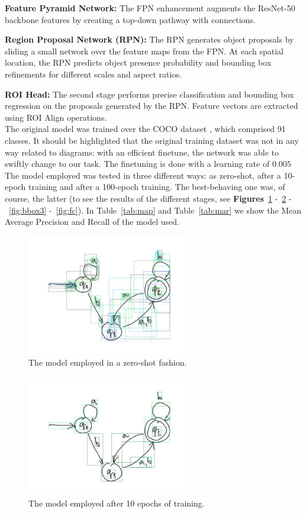 \documentclass[conference]{IEEEtran}
\begin{document}
\textbf{Feature Pyramid Network:} The FPN enhancement augments the ResNet-50 backbone features by creating a top-down pathway with connections.

\textbf{Region Proposal Network (RPN):} The RPN generates object proposals by sliding a small network over the feature maps from the FPN. At each spatial location, the RPN predicts object presence probability and bounding box refinements for different scales and aspect ratios.

\textbf{ROI Head:} The second stage performs precise classification and bounding box regression on the proposals generated by the RPN. Feature vectors are extracted using ROI Align operations. \\

The original model was trained over the COCO dataset \cite{coco}, which comprised 91 classes. It should be highlighted that the original training dataset was not in any way related to diagrams: with an efficient finetune, the network was able to swiftly change to our task. The finetuning is done with a learning rate of $0.005$ \\

The model employed was tested in three different ways: as zero-shot, after a 10-epoch training and after a 100-epoch training. The best-behaving one was, of course, the latter (to see the results of the different stages, see \textbf{Figures}~\ref{fig:bbox1} -~\ref{fig:bbox2} -~\ref{fig:bbox3} -~\ref{fig:fc}). In Table~\ref{tab:map} and Table~\ref{tab:mar} we show the Mean Average Precision and Recall of the model used.

\begin{figure}[H]
	\centering
	\includegraphics[width=200pt, height=150pt]{bbox1.jpg}
	\caption{The model employed in a zero-shot fashion.}
	\label{fig:bbox1}
\end{figure}

\begin{figure}[H]
	\centering
	\includegraphics[width=200pt, height=150pt]{bbox2.jpg}
	\caption{The model employed after 10 epochs of training.}
	\label{fig:bbox2}
\end{figure}
\end{document}

